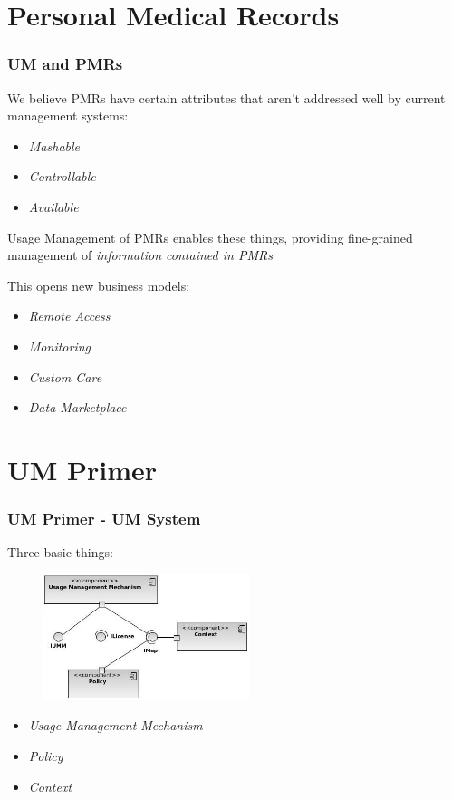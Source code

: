 \documentclass[t, 10pt]{beamer}
\begin{document}
\section{Personal Medical Records}
\begin{frame}
\frametitle{UM and PMRs}

We believe PMRs have certain attributes that aren't addressed well by current management systems:
\pause
\begin{itemize}
\item \textit{Mashable}
\pause
\item \textit{Controllable}
\pause
\item \textit{Available}
\end{itemize}
\pause

Usage Management of PMRs enables these things, providing fine-grained management of \textit{information contained in PMRs}
\newline
\newline
\pause

This opens new business models:
\pause
\begin{itemize}
\item \textit{Remote Access}
\pause
\item \textit{Monitoring}
\pause
\item \textit{Custom Care}
\pause
\item \textit{Data Marketplace}
\end{itemize}
 
\end{frame}

\section{UM Primer}
\begin{frame}
\frametitle{UM Primer - UM System}

Three basic things:
\begin{figure}
\includegraphics[width = 6cm]{Integrated}
\end{figure}

\begin{itemize}
\item \textit{Usage Management Mechanism}
\item \textit{Policy}
\item \textit{Context}
\end{itemize}

\end{frame}
\end{document}
